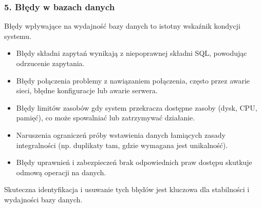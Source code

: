 \documentclass[a4paper,11pt,openany,english]{sphinxmanual}
\begin{document}
\subsubsection{5. Błędy w bazach danych}
\label{\detokenize{rozdzial2/Wydajnosc-Skalowanie-i-Replikacja/index:bledy-w-bazach-danych}}
\sphinxAtStartPar
Błędy wpływające na wydajność bazy danych to istotny wskaźnik kondycji systemu.
\begin{description}
\begin{itemize}
\item {} 
\sphinxAtStartPar
Błędy składni zapytań \textendash{} wynikają z niepoprawnej składni SQL, powodując odrzucenie zapytania.

\item {} 
\sphinxAtStartPar
Błędy połączenia \textendash{} problemy z nawiązaniem połączenia, często przez awarie sieci, błędne konfiguracje lub awarie serwera.

\item {} 
\sphinxAtStartPar
Błędy limitów zasobów \textendash{} gdy system przekracza dostępne zasoby (dysk, CPU, pamięć), co może spowalniać lub zatrzymywać działanie.

\item {} 
\sphinxAtStartPar
Naruszenia ograniczeń \textendash{} próby wstawienia danych łamiących zasady integralności (np. duplikaty tam, gdzie wymagana jest unikalność).

\item {} 
\sphinxAtStartPar
Błędy uprawnień i zabezpieczeń \textendash{} brak odpowiednich praw dostępu skutkuje odmową operacji na danych.

\end{itemize}

\sphinxAtStartPar
Skuteczna identyfikacja i usuwanie tych błędów jest kluczowa dla stabilności i wydajności bazy danych.

\end{description}
\end{document}
